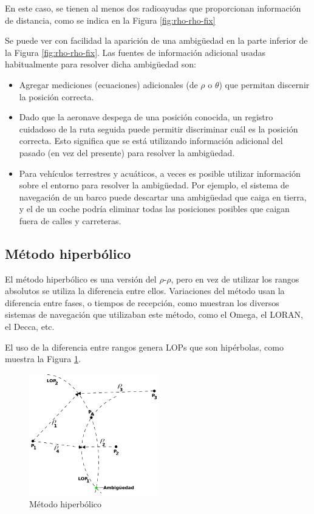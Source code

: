 \documentclass[a4paper,12pt,twoside]{article}
\begin{document}
En este caso, se tienen al menos dos radioayudas que proporcionan informaci\'on de distancia, como se indica en la Figura \ref{fig:rho-rho-fix}

Se puede ver con facilidad la aparici\'on de una ambigüedad en la parte inferior de la Figura \ref{fig:rho-rho-fix}. Las fuentes de informaci\'on adicional usadas habitualmente para resolver dicha ambigüedad son:

\begin{itemize}\item  Agregar mediciones (ecuaciones) adicionales (de $\rho$ o $\theta$)
  que permitan discernir la posici\'on correcta.

\item Dado que la aeronave despega de una posici\'on conocida, un registro
  cuidadoso de la ruta seguida puede permitir discriminar cu\'al es la
  posici\'on correcta. Esto significa que se est\'a utilizando informaci\'on
  adicional del pasado (en vez del presente) para resolver la
  ambigüedad.

\item Para veh\'iculos terrestres y acu\'aticos, a veces es posible utilizar
  informaci\'on sobre el entorno para resolver la ambigüedad. Por
  ejemplo, el sistema de navegaci\'on de un barco puede descartar una
  ambigüedad que caiga en tierra, y el de un coche podr\'ia eliminar
  todas las posiciones posibles que caigan fuera de calles y
  carreteras.
\end{itemize}

\subsection{M\'etodo hiperb\'olico}

El m\'etodo hiperb\'olico es una versi\'on del $\rho$-$\rho$, pero en vez de utilizar los rangos absolutos se utiliza la diferencia entre ellos. Variaciones del m\'etodo usan la diferencia entre fases, o tiempos de recepci\'on, como muestran los diversos sistemas de navegaci\'on que utilizaban este m\'etodo, como el Omega, el LORAN, el Decca, etc.

El uso de la diferencia entre rangos genera LOPs que son hip\'erbolas, como muestra la Figura \ref{fig:metodo-hiperbolico}.

\begin{figure}[!h]
  \centering
  \includegraphics[width=0.5\textwidth]{./Imagenes/hiperbolic-fix.png}
  \caption{M\'etodo hiperb\'olico}
  \label{fig:metodo-hiperbolico}
\end{figure}
\end{document}
